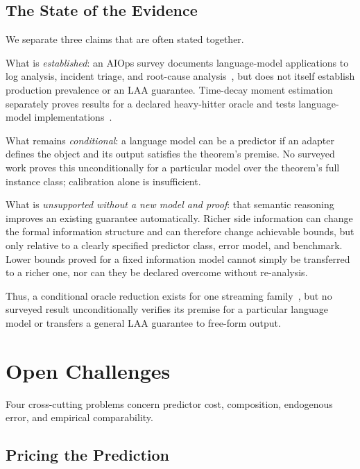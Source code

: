 \documentclass[acmsmall,screen,nonacm]{acmart}
\theoremstyle{acmdefinition}%
\begin{document}
\subsection{The State of the Evidence}
\label{subsec:llm_evidence}

We separate three claims that are often stated together.

What is \emph{established}: an AIOps survey documents language-model applications to log analysis, incident triage, and root-cause analysis~\cite{zhang2026aiops}, but does not itself establish production prevalence or an LAA guarantee. Time-decay moment estimation separately proves results for a declared heavy-hitter oracle and tests language-model implementations~\cite{nagawanshi2026moment}.

What remains \emph{conditional}: a language model can be a predictor if an adapter defines the object and its output satisfies the theorem's premise. No surveyed work proves this unconditionally for a particular model over the theorem's full instance class; calibration alone is insufficient.

What is \emph{unsupported without a new model and proof}: that semantic reasoning improves an existing guarantee automatically. Richer side information can change the formal information structure and can therefore change achievable bounds, but only relative to a clearly specified predictor class, error model, and benchmark. Lower bounds proved for a fixed information model cannot simply be transferred to a richer one, nor can they be declared overcome without re-analysis.

Thus, a conditional oracle reduction exists for one streaming family~\cite{nagawanshi2026moment}, but no surveyed result unconditionally verifies its premise for a particular language model or transfers a general LAA guarantee to free-form output.

%
\section{Open Challenges}
\label{sec:open_challenges}

Four cross-cutting problems concern predictor cost, composition, endogenous error, and empirical comparability.



\subsection{Pricing the Prediction}
\label{subsec:overhead}
\end{document}
